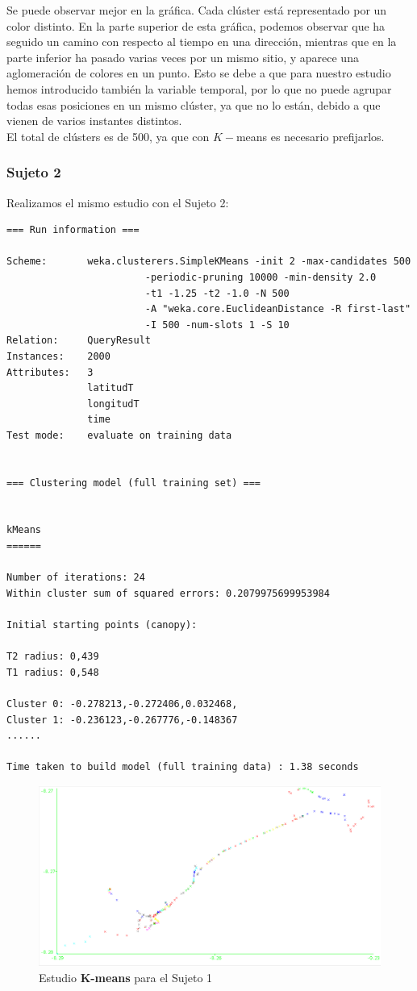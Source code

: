 \documentclass[a4paper, 12pt]{article}
\begin{document}
Se puede observar mejor en la gr\'afica. Cada cl\'uster est\'a representado por un color distinto. En la parte superior de esta gr\'afica, podemos observar que ha seguido un camino con respecto al tiempo en una direcci\'on, mientras que en la parte inferior ha pasado varias veces por un mismo sitio, y aparece una aglomeraci\'on de colores en un punto. Esto se debe a que para nuestro estudio hemos introducido tambi\'en la variable temporal, por lo que no puede agrupar todas esas posiciones en un mismo cl\'uster, ya que no lo est\'an, debido a que vienen de varios instantes distintos. \\

El total de cl\'usters es de 500, ya que con $K-$means es necesario prefijarlos.


\subsubsection{Sujeto 2}

Realizamos el mismo estudio con el Sujeto 2:\\

\begin{verbatim}
=== Run information ===

Scheme:       weka.clusterers.SimpleKMeans -init 2 -max-candidates 500 
						-periodic-pruning 10000 -min-density 2.0 
						-t1 -1.25 -t2 -1.0 -N 500 
						-A "weka.core.EuclideanDistance -R first-last" 
						-I 500 -num-slots 1 -S 10
Relation:     QueryResult
Instances:    2000
Attributes:   3
              latitudT
              longitudT
              time
Test mode:    evaluate on training data


=== Clustering model (full training set) ===


kMeans
======

Number of iterations: 24
Within cluster sum of squared errors: 0.2079975699953984

Initial starting points (canopy):

T2 radius: 0,439     
T1 radius: 0,548     

Cluster 0: -0.278213,-0.272406,0.032468,
Cluster 1: -0.236123,-0.267776,-0.148367
......

Time taken to build model (full training data) : 1.38 seconds
\end{verbatim}


\begin{figure}[H]
	\includegraphics[scale=.5]{../comparativa/kMeansSujeto2.png}
	\caption{Estudio \textbf{K-means} para el Sujeto 1}
\end{figure}
\end{document}
